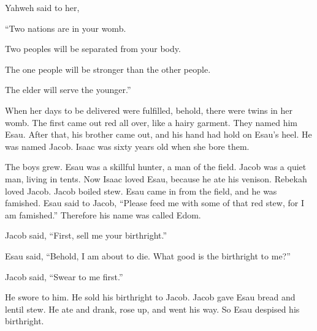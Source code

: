 {Yahweh said to her,
\par }{\Q “Two nations are in your womb.
\par }{\Q Two peoples will be separated from your body.
\par }{\Q The one people will be stronger than the other people.
\par }{\Q The elder will serve the younger.”
\par }{\PP {}When her days to be delivered were fulfilled, behold, there were twins in her womb.
The first came out red all over, like a hairy garment. They named him Esau.
After that, his brother came out, and his hand had hold on Esau’s heel. He was named Jacob. Isaac was sixty years old when she bore them.
\par }{\PP {}The boys grew. Esau was a skillful hunter, a man of the field. Jacob was a quiet man, living in tents.
Now Isaac loved Esau, because he ate his venison. Rebekah loved Jacob.
Jacob boiled stew. Esau came in from the field, and he was famished.
Esau said to Jacob, “Please feed me with some of that red stew, for I am famished.” Therefore his name was called Edom.
\par }{\PP {}Jacob said, “First, sell me your birthright.”
\par }{\PP {}Esau said, “Behold, I am about to die. What good is the birthright to me?”
\par }{\PP {}Jacob said, “Swear to me first.”
\par }{\PP He swore to him. He sold his birthright to Jacob.
Jacob gave Esau bread and lentil stew. He ate and drank, rose up, and went his way. So Esau despised his birthright.

}
